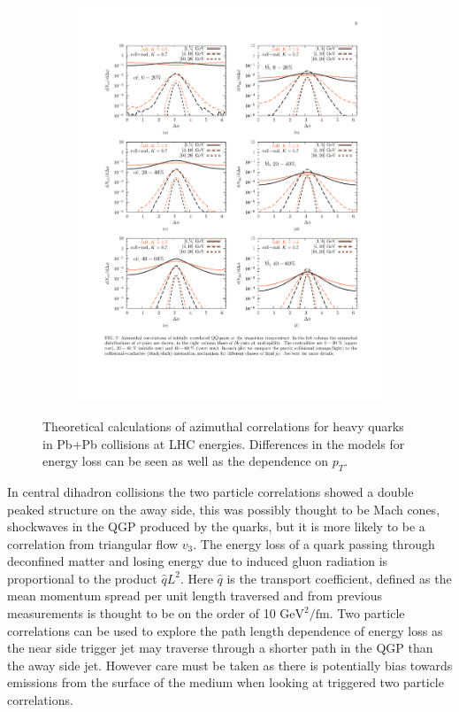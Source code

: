 \begin{figure}[htbp]
\begin{center}
\begin{subfigure}{0.75\textwidth}
        \includegraphics[width=\textwidth]{Plots/Intro/bb_cent.pdf}
        \caption{}
        \label{fig:bbbarcent}
    \end{subfigure}
	\end{center}
\caption[Correlations $c$ and $b$ at LHC Energies]{Theoretical calculations of azimuthal correlations for heavy quarks in Pb+Pb collisions at LHC energies. Differences in the models for energy loss can be seen as well as the dependence on $p_{T}$.}
\label{fig:qqcorr}
\end{figure}

In central dihadron collisions the two particle correlations showed a double peaked structure on the away side, this was possibly thought to be Mach cones, shockwaves in the QGP produced by the quarks, but it is more likely to be a correlation from triangular flow $v_3$. The energy loss of a quark passing through deconfined matter and losing energy due to induced gluon radiation is proportional to the product $\hat{q}L^2$. Here $\hat{q}$ is the transport coefficient, defined as the mean momentum spread per unit length traversed and from previous measurements is thought to be on the order of 10 $\text{GeV}^2/\text{fm}$. Two particle correlations can be used to explore the path length dependence of energy loss as the near side trigger jet may traverse through a shorter path in the QGP than the away side jet. However care must be taken as there is potentially bias towards emissions from the surface of the medium when looking at triggered two particle correlations. 

